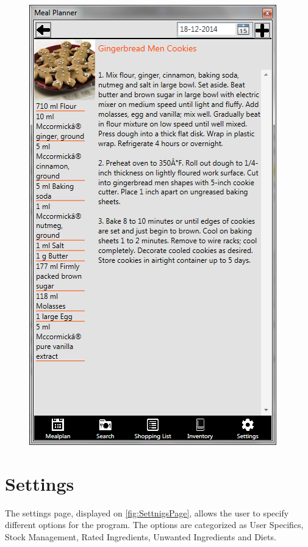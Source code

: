 \begin{figure}[H]
\begin{minipage}{.33\textwidth}
  \includegraphics[width=.9\linewidth]{Grafik/RecipePage}
  \label{fig:RecipePage}
\end{minipage}%
\end{figure}

\section{Settings} \label{ss:settings}
The settings page, displayed on \cref{fig:SettnigsPage}, allows the user to specify different options for the program. The options are categorized as User Specifics, Stock Management, Rated Ingredients, Unwanted Ingredients and Diets.


